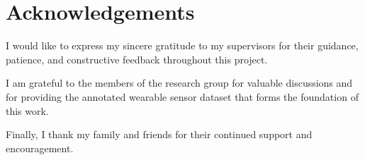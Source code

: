 \chapter*{Acknowledgements}


I would like to express my sincere gratitude to my supervisors for their
guidance, patience, and constructive feedback throughout this project.

I am grateful to the members of the research group for valuable discussions
and for providing the annotated wearable sensor dataset that forms the
foundation of this work.

Finally, I thank my family and friends for their continued support and
encouragement.

\cleardoublepage
